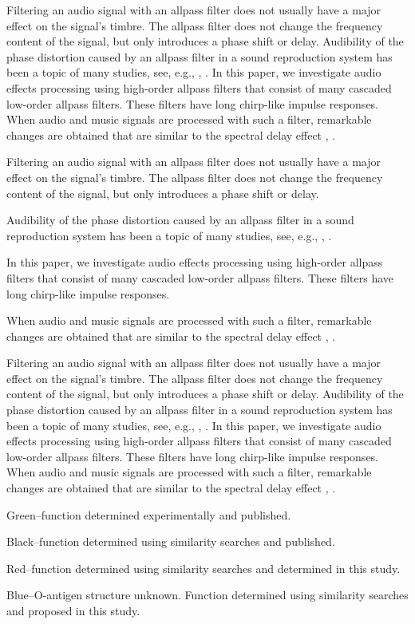 \documentclass{aes2e}
\begin{document}
Filtering an audio signal with an allpass filter does not usually have a major effect on the signal's timbre. The allpass filter does not change the frequency content of the signal, but only introduces a phase shift or delay. Audibility of the phase distortion caused by an allpass filter in a sound reproduction system has been a topic of many studies, see, e.g., \cite{DEK1}, \cite{DEK2}. In this paper, we investigate audio effects processing using high-order allpass filters that consist of many cascaded low-order allpass filters. These filters have long chirp-like impulse responses. When audio and music signals are processed with such a filter, remarkable changes are obtained that are similar to the spectral delay effect  \cite{DEK3}, \cite{DEK4}.
\begin{paralist}
\item{}Filtering an audio signal with an allpass filter does not usually have a major effect on the signal's timbre. The allpass filter does not change the frequency content of the signal, but only introduces a phase shift or delay. 
\item{}Audibility of the phase distortion caused by an allpass filter in a sound reproduction system has been a topic of many studies, see, e.g., \cite{DEK1}, \cite{DEK2}. 
\item{}In this paper, we investigate audio effects processing using high-order allpass filters that consist of many cascaded low-order allpass filters. These filters have long chirp-like impulse responses. 
\item{}When audio and music signals are processed with such a filter, remarkable changes are obtained that are similar to the spectral delay effect  \cite{DEK3}, \cite{DEK4}.
\end{paralist}

Filtering an audio signal with an allpass filter does not usually have a major effect on the signal's timbre. The allpass filter does not change the frequency content of the signal, but only introduces a phase shift or delay. Audibility of the phase distortion caused by an allpass filter in a sound reproduction system has been a topic of many studies, see, e.g., \cite{DEK1}, \cite{DEK2}. In this paper, we investigate audio effects processing using high-order allpass filters that consist of many cascaded low-order allpass filters. These filters have long chirp-like impulse responses. When audio and music signals are processed with such a filter, remarkable changes are obtained that are similar to the spectral delay effect  \cite{DEK3}, \cite{DEK4}.
\begin{arabiclist}
\item{}Green--function determined experimentally and published.
\item{}Black--function determined using similarity searches and published.
\item{}Red--function determined using similarity searches and determined in this study.
\item{}Blue--O-antigen structure unknown. Function determined using similarity searches and proposed in this study.
\end{arabiclist}
\end{document}
